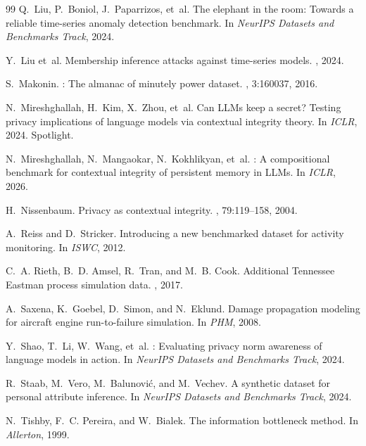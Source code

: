\documentclass{article}
\theoremstyle{remark}
\begin{document}
\begin{thebibliography}{99}
Q.~Liu, P.~Boniol, J.~Paparrizos, et~al.
\newblock The elephant in the room: Towards a reliable time-series anomaly detection benchmark.
\newblock In {\em NeurIPS Datasets and Benchmarks Track}, 2024.

Y.~Liu et~al.
\newblock Membership inference attacks against time-series models.
, 2024.

S.~Makonin.
: The almanac of minutely power dataset.
, 3:160037, 2016.

N.~Mireshghallah, H.~Kim, X.~Zhou, et~al.
\newblock Can {LLM}s keep a secret? Testing privacy implications of language models via contextual integrity theory.
\newblock In {\em ICLR}, 2024.
\newblock Spotlight.

N.~Mireshghallah, N.~Mangaokar, N.~Kokhlikyan, et~al.
: A compositional benchmark for contextual integrity of persistent memory in {LLM}s.
\newblock In {\em ICLR}, 2026.

H.~Nissenbaum.
\newblock Privacy as contextual integrity.
, 79:119--158, 2004.

A.~Reiss and D.~Stricker.
\newblock Introducing a new benchmarked dataset for activity monitoring.
\newblock In {\em ISWC}, 2012.

C.~A. Rieth, B.~D. Amsel, R.~Tran, and M.~B. Cook.
\newblock Additional {Tennessee Eastman} process simulation data.
, 2017.

A.~Saxena, K.~Goebel, D.~Simon, and N.~Eklund.
\newblock Damage propagation modeling for aircraft engine run-to-failure simulation.
\newblock In {\em PHM}, 2008.

Y.~Shao, T.~Li, W.~Wang, et~al.
: Evaluating privacy norm awareness of language models in action.
\newblock In {\em NeurIPS Datasets and Benchmarks Track}, 2024.

R.~Staab, M.~Vero, M.~Balunovi\'c, and M.~Vechev.
\newblock A synthetic dataset for personal attribute inference.
\newblock In {\em NeurIPS Datasets and Benchmarks Track}, 2024.

N.~Tishby, F.~C. Pereira, and W.~Bialek.
\newblock The information bottleneck method.
\newblock In {\em Allerton}, 1999.

\end{thebibliography}
\end{document}
